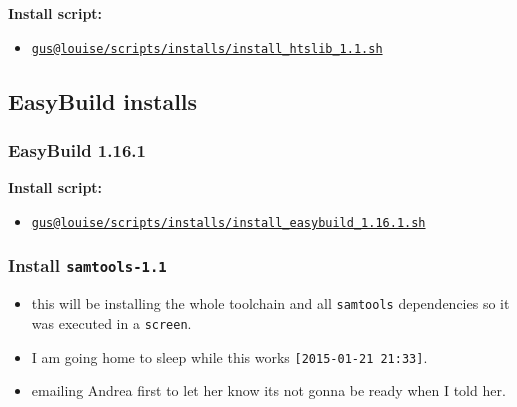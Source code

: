\documentclass[letterpaper]{scrartcl}
\newenvironment{Shaded}{}{}
\newcommand{\KeywordTok}[1]{\textcolor[rgb]{0.00,0.44,0.13}{\textbf{{#1}}}}
\newcommand{\NormalTok}[1]{{#1}}
\begin{document}
\textbf{Install script:}

\begin{itemize}
\itemsep1pt\parskip0pt
\item
  \href{file:///home/gus/remote_mounts/louise/scripts/installs/install_htslib_1.1.sh}{\texttt{gus@louise/scripts/installs/install\_htslib\_1.1.sh}}
\end{itemize}

\subsection{EasyBuild installs}\label{easybuild-installs}

\subsubsection{EasyBuild 1.16.1}\label{easybuild-1.16.1}

\textbf{Install script:}

\begin{itemize}
\itemsep1pt\parskip0pt
\item
  \href{file:///home/gus/remote_mounts/louise/scripts/installs/install_easybuild_1.16.1.sh}{\texttt{gus@louise/scripts/installs/install\_easybuild\_1.16.1.sh}}
\end{itemize}

\subsubsection{Install
\texttt{samtools-1.1}}\label{install-samtools-1.1}

\begin{Shaded}
\end{Shaded}

\begin{itemize}
\itemsep1pt\parskip0pt
\item
  this will be installing the whole toolchain and all \texttt{samtools}
  dependencies so it was executed in a \texttt{screen}.
\item
  I am going home to sleep while this works
  \texttt{{[}2015-01-21 21:33{]}}.
\item
  emailing Andrea first to let her know its not gonna be ready when I
  told her.
\end{itemize}
\end{document}
